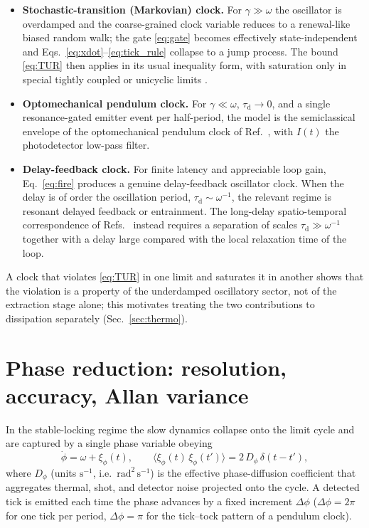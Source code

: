 \documentclass[aps,pre,reprint,amsmath,amssymb,floatfix,nofootinbib]{revtex4-2}
\newcommand{\avg}[1]{\langle #1 \rangle}
\newcommand{\Dphi}{D_{\phi}}
\newcommand{\taud}{\tau_{\mathrm{d}}}
\begin{document}
\begin{itemize}
\item \textbf{Stochastic-transition (Markovian) clock.}
For $\gamma \gg \omega$ the oscillator is overdamped and the coarse-grained
clock variable reduces to a renewal-like biased random walk; the gate
\eqref{eq:gate} becomes effectively state-independent and
Eqs.~\eqref{eq:xdot}--\eqref{eq:tick_rule} collapse to a jump process.
The bound \eqref{eq:TUR} then applies in its usual inequality form,
with saturation only in special tightly coupled or unicyclic limits
\cite{BaratoSeifert2016,Erker2017,Meier2023}.

\item \textbf{Optomechanical pendulum clock.}
For $\gamma \ll \omega$, $\taud \to 0$, and a single resonance-gated
emitter event per half-period, the model is the semiclassical envelope of
the optomechanical pendulum clock of Ref.~\cite{Brunelli2026}, with
$I(t)$ the photodetector low-pass filter.

\item \textbf{Delay-feedback clock.}
For finite latency and appreciable loop gain, Eq.~\eqref{eq:fire}
produces a genuine delay-feedback oscillator clock. When the delay is of
order the oscillation period, $\taud \sim \omega^{-1}$, the relevant
regime is resonant delayed feedback or entrainment. The long-delay
spatio-temporal correspondence of
Refs.~\cite{GiacomelliPoliti1996,YanchukGiacomelli2017} instead requires a
separation of scales $\taud \gg \omega^{-1}$ together with a delay large
compared with the local relaxation time of the loop.
\end{itemize}

A clock that violates \eqref{eq:TUR} in one limit and saturates it in
another shows that the violation is a property of the underdamped
oscillatory sector, not of the extraction stage alone; this motivates
treating the two contributions to dissipation separately
(Sec.~\ref{sec:thermo}).

\section{Phase reduction: resolution, accuracy, Allan variance}
\label{sec:phase}

In the stable-locking regime the slow dynamics collapse onto the limit
cycle and are captured by a single phase variable obeying
\begin{equation}
  \dot{\phi} = \omega + \xi_\phi(t),
  \qquad
  \avg{\xi_\phi(t)\,\xi_\phi(t')} = 2\,\Dphi\,\delta(t-t'),
  \label{eq:phase}
\end{equation}
where $\Dphi$ (units $\mathrm{s}^{-1}$, i.e.\ $\mathrm{rad}^2\,\mathrm{s}^{-1}$)
is the effective phase-diffusion coefficient that aggregates thermal,
shot, and detector noise projected onto the cycle. A detected tick is
emitted each time the phase advances by a fixed increment $\Delta\phi$
($\Delta\phi = 2\pi$ for one tick per period, $\Delta\phi=\pi$ for the
tick--tock pattern of a pendulum clock).
\end{document}
